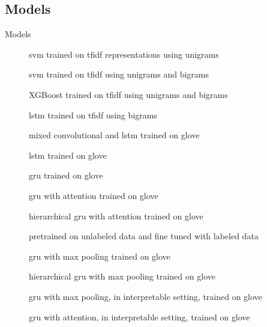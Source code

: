 \subsection{Models}
\begin{frame}{Models}
  \small
  \begin{description}
  \item[\svm] \alert{\acs{svm}} trained on \alert{\acs{tfidf}} representations using \alert{unigrams}
  \item[\svmb] \alert{\acs{svm}} trained on \alert{\acs{tfidf}} using
    \alert{unigrams} and \alert{bigrams}
  \item[\xgb] \alert{XGBoost} trained on \alert{\acs{tfidf}} using
    \alert{unigrams} and \alert{bigrams}
  \item[\lstmng] \alert{\acs{lstm}} trained on \alert{\acs{tfidf}} using
    \alert{bigrams}
  \item[\lstmc] mixed \alert{convolutional} and \alert{\ac{lstm}} trained on
    \alert{\acs{glove}}
  \item[\lstmb] \alert{\acs{lstm}} trained on \alert{\acs{glove}}
  \item[\gru] \alert{\acs{gru}} trained on \alert{\acs{glove}}
  \item[\softmax] \alert{\acs{gru}} with \alert{attention} trained on \alert{\acs{glove}}
  \item[\softmaxh] \alert{hierarchical \acs{gru}} with \alert{attention} trained on \alert{\acs{glove}}
  \item[\bert] \alert{pretrained} on unlabeled data and \alert{fine tuned} with labeled data
  \item[\maxp] \alert{\acs{gru}} with \alert{max} pooling trained on \alert{\acs{glove}}
  \item[\maxh] \alert{hierarchical \acs{gru}} with \alert{max} pooling trained on \alert{\acs{glove}}
  \item[\maxi] \alert{\acs{gru}} with \alert{max} pooling, in \alert{interpretable} setting, trained on \alert{\acs{glove}}
  \item[\softmaxi] \alert{\acs{gru}} with \alert{attention}, in \alert{interpretable} setting, trained on \alert{\acs{glove}}
  \end{description}
\end{frame}

